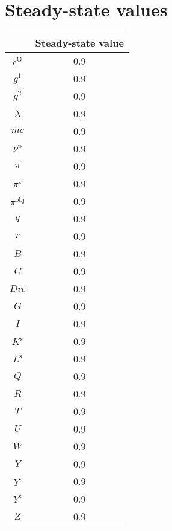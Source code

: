 

\section{Steady-state values}


\begin{tabular}{c|c|}
  & Steady-state value\\
\hline
$\epsilon^{\mathrm{G}}$ & 0.9 \\
$g^{\mathrm{1}}$ & 0.9 \\
$g^{\mathrm{2}}$ & 0.9 \\
$\lambda$ & 0.9 \\
${m\!c}$ & 0.9 \\
$\nu^{\mathrm{p}}$ & 0.9 \\
$\pi$ & 0.9 \\
$\pi^{\star}$ & 0.9 \\
$\pi^{\mathrm{obj}}$ & 0.9 \\
$q$ & 0.9 \\
$r$ & 0.9 \\
$B$ & 0.9 \\
$C$ & 0.9 \\
${D\!i\!v}$ & 0.9 \\
$G$ & 0.9 \\
$I$ & 0.9 \\
$K^{\mathrm{s}}$ & 0.9 \\
$L^{\mathrm{s}}$ & 0.9 \\
$Q$ & 0.9 \\
$R$ & 0.9 \\
$T$ & 0.9 \\
$U$ & 0.9 \\
$W$ & 0.9 \\
$Y$ & 0.9 \\
$Y^{\mathrm{j}}$ & 0.9 \\
$Y^{\mathrm{s}}$ & 0.9 \\
$Z$ & 0.9 \\
\hline
\end{tabular}


